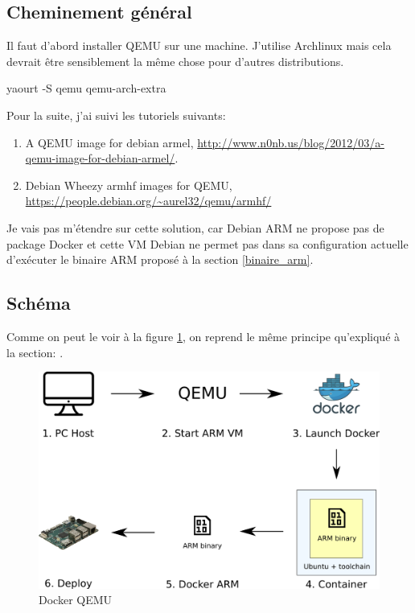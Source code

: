 \documentclass[11pt,a4paper,oneside]{report}
\begin{document}
\subsection{Cheminement général}

Il faut d'abord installer QEMU sur une machine. J'utilise Archlinux mais cela devrait être sensiblement la même chose pour d'autres distributions.

\label{install_qemu_arch}
\begin{bashcode}
yaourt -S qemu qemu-arch-extra
\end{bashcode}

Pour la suite, j'ai suivi les tutoriels suivants: 
\begin{enumerate}
\item A QEMU image for debian armel, \url{http://www.n0nb.us/blog/2012/03/a-qemu-image-for-debian-armel/}.
\item Debian Wheezy armhf images for QEMU, \url{https://people.debian.org/~aurel32/qemu/armhf/}
\end{enumerate}

Je vais pas m'étendre sur cette solution, car Debian ARM ne propose pas de package Docker et cette VM Debian ne permet pas dans sa configuration actuelle d'exécuter le binaire ARM proposé à la section \ref{binaire_arm}.

\subsection{Schéma}

Comme on peut le voir à la figure \ref{fig_docker_qemu}, on reprend le même principe qu'expliqué à la section: .

\begin{figure}
    \begin{center}
        \includegraphics[scale=0.6]{img/docker_qemu}
    \end{center}
    \caption{Docker QEMU}
    \label{fig_docker_qemu}
\end{figure}
\end{document}
